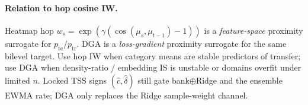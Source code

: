\paragraph{Relation to hop cosine IW.}
Heatmap hop $w_s=\exp(\gamma(\cos(\mu_s,\mu_{t-1})-1))$ is a
\emph{feature-space} proximity surrogate for $p_{\mathrm{te}}/p_{\mathrm{tr}}$.
DGA is a \emph{loss-gradient} proximity surrogate for the same bilevel target.
Use hop IW when category means are stable predictors of transfer; use DGA when
density-ratio / embedding IS is unstable or domains overfit under limited $n$.
Locked TSS signs $(\hat c,\hat\delta)$ still gate bank$\oplus$Ridge and the
ensemble EWMA rate; DGA only replaces the Ridge sample-weight channel.
